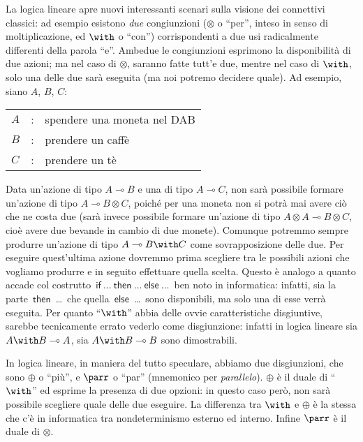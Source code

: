 \documentclass[12pt,a4paper,openright,twoside]{report}
\begin{document}
La logica lineare apre nuovi interessanti scenari sulla visione dei connettivi classici: ad esempio esistono \emph{due} congiunzioni ($\otimes$ o ``per'', inteso in senso di moltiplicazione, ed $\with$ o ``con'') corrispondenti a due usi radicalmente differenti della parola ``e''. Ambedue le congiunzioni esprimono la disponibilit\`a di due azioni; ma nel caso di $\otimes$, saranno fatte tutt'e due, mentre nel caso di $\with$, solo una delle due sar\`a eseguita (ma noi potremo decidere quale). Ad esempio, siano $A$, $B$, $C$:
\begin{center}
\begin{tabular}{lll}
	$A$ & : & spendere una moneta nel DAB \\
	$B$ & : & prendere un caff\`e \\
	$C$ & : & prendere un t\`e 
\end{tabular}
\end{center}
Data un'azione di tipo $A \multimap B$ e una di tipo $A \multimap C$, non sar\`a possibile formare un'azione di tipo $A \multimap B \otimes C$, poich\'e per una moneta non si potr\`a mai avere ci\`o che ne costa due (sar\`a invece possibile formare un'azione di tipo $A \otimes A \multimap B \otimes C$, cio\`e avere due bevande in cambio di due monete). Comunque potremmo sempre produrre un'azione di tipo $A \multimap B \with C$ come sovrapposizione delle due. Per eseguire quest'ultima azione dovremmo prima scegliere tra le possibili azioni che vogliamo produrre e in seguito effettuare quella scelta. Questo \`e analogo a quanto accade col costrutto~$\mathsf{if}~\dots~\mathsf{then}~\dots~\mathsf{else}~\dots$~ben noto in informatica: infatti, sia la parte~$\mathsf{then}$~\dots~che quella~$\mathsf{else}$~\dots~sono disponibili, ma solo una di esse verr\`a eseguita. Per quanto ``$\with$'' abbia delle ovvie caratteristiche disgiuntive, sarebbe tecnicamente errato vederlo come disgiunzione: infatti in logica lineare sia $A \with B \multimap A$, sia $A \with B \multimap B$ sono dimostrabili.

In logica lineare, in maniera del tutto speculare, abbiamo due disgiunzioni, che sono $\oplus$ o ``pi\`u'', e $\parr$ o ``par'' (mnemonico per \emph{parallelo}). $\oplus$ \`e il duale di ``$\with$'' ed esprime la presenza di due opzioni: in questo caso per\`o, non sar\`a possibile scegliere quale delle due eseguire. La differenza tra $\with$ e $\oplus$ \`e la stessa che c'\`e in informatica tra nondeterminismo esterno ed interno. Infine $\parr$ \`e il duale di $\otimes$.
\end{document}
